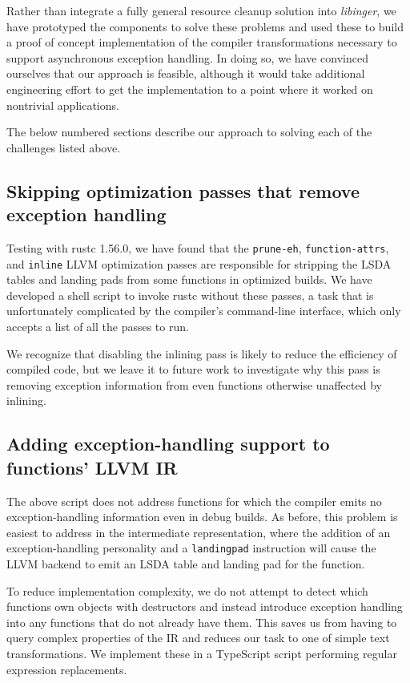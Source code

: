 Rather than integrate a fully general resource cleanup solution into
\textit{libinger}, we have prototyped the components to solve these problems and used
these to build a proof of concept implementation of the compiler transformations
necessary to support asynchronous exception handling.  In doing so, we have convinced
ourselves that our approach is feasible, although it would take additional
engineering effort to get the implementation to a point where it worked on nontrivial
applications.

The below numbered sections describe our approach to solving each of the
challenges listed above.


\subsection{Skipping optimization passes that remove exception handling}

Testing with rustc 1.56.0, we have found that the \texttt{prune-eh},
\texttt{function-attrs}, and \texttt{inline} LLVM optimization passes are
responsible for stripping the LSDA tables and landing pads from some functions in
optimized builds.  We have developed a shell script to invoke rustc without these
passes, a task that is unfortunately complicated by the compiler's command-line
interface, which only accepts a list of all the passes to run.

We recognize that disabling the inlining pass is likely to reduce the efficiency of
compiled code, but we leave it to future work to investigate why this pass is
removing exception information from even functions otherwise unaffected by inlining.


\subsection{Adding exception-handling support to functions' LLVM IR}
\label{sec:ingerc:optimization}

The above script does not address functions for which the compiler emits no
exception-handling information even in debug builds.  As before, this problem is
easiest to address in the intermediate representation, where the addition of an
exception-handling personality and a \texttt{landingpad} instruction will cause the
LLVM backend to emit an LSDA table and landing pad for the function.

To reduce implementation complexity, we do not attempt to detect which functions own
objects with destructors and instead introduce exception handling into any functions
that do not already have them.  This saves us from having to query complex properties
of the IR and reduces our task to one of simple text transformations.  We implement
these in a TypeScript script performing regular expression replacements.

